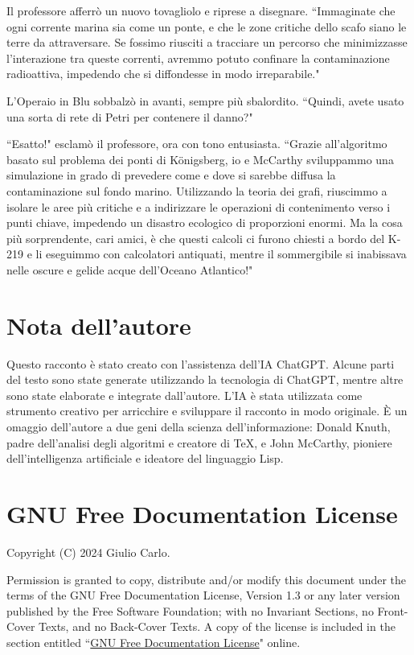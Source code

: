 \documentclass[12pt,b5paper]{article}
\begin{document}
Il professore afferrò un nuovo tovagliolo e riprese a disegnare. ``Immaginate che ogni
corrente marina sia come un ponte, e che le zone critiche dello scafo siano le terre
da attraversare. Se fossimo riusciti a tracciare un percorso che minimizzasse
l'interazione tra queste correnti, avremmo potuto confinare la contaminazione
radioattiva, impedendo che si diffondesse in modo irreparabile."

L'Operaio in Blu sobbalzò in avanti, sempre più sbalordito. ``Quindi, avete
usato una sorta di rete di Petri per contenere il danno?"

``Esatto!" esclamò il professore, ora con tono entusiasta. ``Grazie all'algoritmo
basato sul problema dei ponti di Königsberg, io e McCarthy sviluppammo una
simulazione in grado di prevedere come e dove si sarebbe diffusa la contaminazione
sul fondo marino. Utilizzando la teoria dei grafi, riuscimmo a isolare le aree
più critiche e a indirizzare le operazioni di contenimento verso i punti chiave,
impedendo un disastro ecologico di proporzioni enormi. Ma la cosa più sorprendente,
cari amici, è che questi calcoli ci furono chiesti a bordo del K-219 e li
eseguimmo con calcolatori antiquati, mentre il sommergibile si inabissava nelle
oscure e gelide acque dell'Oceano Atlantico!"

\newpage
\section*{Nota dell'autore}
Questo racconto è stato creato con l'assistenza dell'IA ChatGPT. Alcune parti
del testo sono state generate utilizzando la tecnologia di ChatGPT, mentre
altre sono state elaborate e integrate dall'autore. L'IA è stata utilizzata
come strumento creativo per arricchire e sviluppare il racconto in modo
originale. È un omaggio dell'autore a due geni della scienza dell'informazione:
Donald Knuth, padre dell'analisi degli algoritmi e creatore di TeX, e
John McCarthy, pioniere dell'intelligenza artificiale e ideatore del linguaggio
Lisp.

\section*{GNU Free Documentation License}
    Copyright (C)  2024 Giulio Carlo.
   
    Permission is granted to copy, distribute and/or modify this document
    under the terms of the GNU Free Documentation License, Version 1.3
    or any later version published by the Free Software Foundation;
    with no Invariant Sections, no Front-Cover Texts, and no Back-Cover Texts.
    A copy of the license is included in the section entitled ``\href{https://www.gnu.org/licenses/fdl-1.3.en.html}{GNU Free Documentation License}"
    online.
\end{document}
